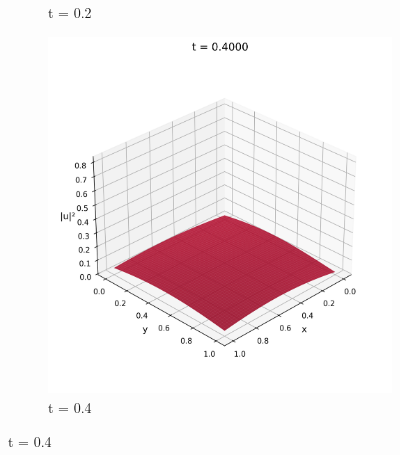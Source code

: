 \documentclass{article}
\theoremstyle{definition}
\theoremstyle{plain}
\theoremstyle{remark}
\begin{document}
\begin{figure}[h]
\begin{subfigure}[b]{0.3\textwidth}
    \caption{t = 0.2}
  \end{subfigure}
  \hfill
  \begin{subfigure}[b]{0.3\textwidth}
    \centering
    \includegraphics[width=\textwidth, trim=0cm 0cm 0cm 1cm, clip]{figures/pinn_frame_0020.png}
    \caption{t = 0.4}
  \end{subfigure}
  
  \vspace{0.5cm}
  

\end{figure}
\end{document}
